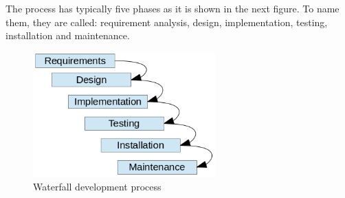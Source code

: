 \documentclass[12pt,final,oneside]{fithesis}
\begin{document}
The process has typically five phases as it is shown in the next figure. To name them, they are called: requirement analysis, design, implementation, testing, installation and maintenance.\\

\begin{figure}
	\centering
	\includegraphics[width=70mm]{img/waterfall.png}
	\caption{Waterfall development process}
	\label{fig:waterfall_process}
\end{figure}
\end{document}

